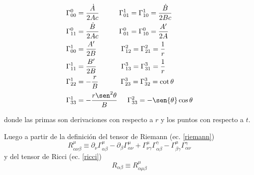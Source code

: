 \begin{equation}
\begin{split}
&\Gamma^{0}_{00} = \frac{\dot{A}}{2Ac} \hspace{1cm} \Gamma^{1}_{01} = \Gamma^{1}_{10} = \frac{\dot{B}}{2Bc} \\
&\Gamma^{0}_{11} = \frac{\dot{B}}{2Ac} \hspace{1cm} \Gamma^{0}_{01} = \Gamma^{0}_{10} = \frac{A'}{2A} \\
&\Gamma^{1}_{00} = \frac{A'}{2B} \hspace{1cm} ~~\Gamma^{2}_{12} = \Gamma^{2}_{21} = \frac{1}{r} \\
&\Gamma^{1}_{11} = \frac{B'}{2B} \hspace{1cm} ~~\Gamma^{3}_{13} = \Gamma^{3}_{31} = \frac{1}{r} \\
&\Gamma^{1}_{22} = -\frac{r}{B} \hspace{1cm} ~\Gamma^{3}_{23} = \Gamma^{3}_{32} = \cot{\theta} \\
&\Gamma^{1}_{33} = -\frac{r\sen^2{\theta}}{B} \hspace{0.5cm} \Gamma^{2}_{33} = -\sen{\theta}\cos{\theta} \\
\end{split}
\end{equation}

donde las primas son derivaciones con respecto a $r$ y los puntos con respecto a $t$.

Luego a partir de la definición del tensor de Riemann (ec. \ref{riemann}) 
\begin{equation*}
R^\mu_{\alpha \nu \beta}\equiv\partial_{\nu}\Gamma^{\mu}_{\alpha \beta}-\partial_{\beta}\Gamma^{\mu}_{\alpha\nu}+\Gamma^{\mu}_{\nu\gamma}\Gamma^{\gamma}_{\alpha\beta}-\Gamma^{\mu}_{\beta\gamma}\Gamma^{\gamma}_{\alpha\nu}
\end{equation*}
y del tensor de Ricci (ec. \ref{ricci}) 
\begin{equation*}
R_{\alpha\beta} \equiv R^\mu_{\alpha \mu \beta}
\end{equation*}

